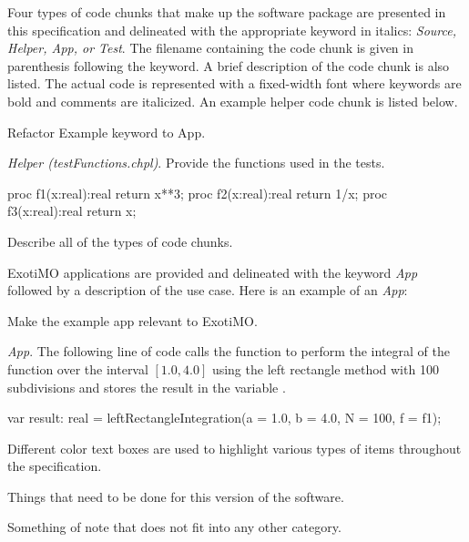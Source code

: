\label{Notation}

Four types of code chunks that make up the software package are 
presented in this specification and delineated
with the appropriate keyword in italics: 
\textit{Source, Helper, App, or Test}.  The filename containing the code
chunk is given in parenthesis following the keyword. A brief description 
of the code chunk is also listed.
The actual code is represented with a fixed-width font where keywords are
bold and comments are italicized. An example helper code chunk is listed
below.
\begin{TODO}
  Refactor Example keyword to App.
\end{TODO}

\textit{Helper (testFunctions.chpl)}. Provide the functions used
in the tests.
\begin{chapel}
  proc f1(x:real):real {
    return x**3;
  } 
  proc f2(x:real):real {
    return 1/x;
  } 
  proc f3(x:real):real {
    return x;
  } 
\end{chapel}

\begin{TODO}
  Describe all of the types of code chunks.
\end{TODO}

ExotiMO applications are provided and delineated with the
keyword \textit{App} followed by a description of the use case. Here is
an example of an \textit{App}:

\begin{TODO}
  Make the example app relevant to ExotiMO.
\end{TODO}

\textit{App}. The following line of code calls the function
 to perform the integral of the function 
over the interval $[1.0,4.0]$ using the left rectangle method with 100 subdivisions
and stores the result in the variable .
\begin{chapel}
  var result: real = leftRectangleIntegration(a = 1.0, b = 4.0, N = 100, f = f1);
\end{chapel}

Different color text boxes are used to highlight various types of items 
throughout the specification.

\begin{TODO}
  Things that need to be done for this version of the software.
\end{TODO}

\begin{note}
  Something of note that does not fit into any other category.
\end{note}

